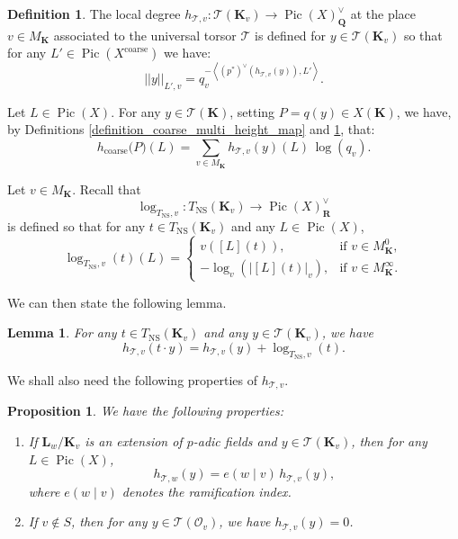 \documentclass{proc-l}
\newcommand{\R}{\mathbf{R}}
\newcommand{\K}{\mathbf{K}}
\newcommand{\Q}{\mathbf{Q}}
\newcommand{\Le}{\mathbf{L}}
\DeclareMathOperator{\Pic}{Pic}
\DeclareMathOperator{\NS}{NS}
\DeclareMathOperator{\coarse}{coarse}
\newcommand{\stackT}{\mathcal{T}}
\newcommand{\sheafO}{\mathcal{O}}
\newtheorem{lemma}[theorem]{Lemma}
\newtheorem{prop}[theorem]{Proposition}
\theoremstyle{definition}
\newtheorem{definition}[theorem]{Definition}
\theoremstyle{remark}
\numberwithin{equation}{section}
\begin{document}
\begin{definition}\label{definition_naive_local_degree}
    The local degree $h_{\stackT,v} :\stackT(\K_v) \rightarrow \Pic(X)^{\vee}_{\Q}$ at the place $v \in M_{\K}$ associated to the universal torsor $\stackT$ is defined for $y \in \stackT(\K_v)$ so that for any $L' \in \Pic(X^{\coarse})$ we have:
    $$||y||_{L',v} = q_v^{- \left\langle (p^*)^{\vee}(h_{\stackT,v}(y)) , L' \right\rangle }  .$$

\end{definition}

Let $L \in \Pic(X)$. For any $y \in \stackT(\K)$, setting
$P = q(y) \in X(\K)$, we have, by Definitions \ref{definition_coarse_multi_height_map} and \ref{definition_naive_local_degree}, that:
\begin{equation}\label{equation_local_height_global_height_coarse_space}
h_{\coarse}\bigl(P\bigr)(L)
=
\sum_{v \in M_{\K}}
h_{\stackT,v}(y)(L)\, \log(q_v).
\end{equation}

Let $v \in M_{\K}$. Recall that
\[
\log_{T_{\NS},v} : T_{\NS}(\K_v) \longrightarrow \Pic(X)^{\vee}_{\R}
\]
is defined so that for any $t \in T_{\NS}(\K_v)$ and any $L \in \Pic(X)$,
\[
\log_{T_{\NS},v}(t)(L)
=
\begin{cases}
v\!\left([L](t)\right), & \text{if } v \in M_{\K}^{0}, \\[0.3em]
- \log_v\!\left(\lvert [L](t) \rvert_v\right), & \text{if } v \in M_{\K}^{\infty}.
\end{cases}
\]

We can then state the following lemma.

\begin{lemma}\label{lemma_hauteur_locale_torseur_univ_et_action_de_tns}
For any $t \in T_{\NS}(\K_v)$ and any $y \in \stackT(\K_v)$, we have
\[
h_{\stackT,v}(t \cdot y)
=
h_{\stackT,v}(y) + \log_{T_{\NS},v}(t).
\]
\end{lemma}

We shall also need the following properties of $h_{\stackT,v}$.

\begin{prop}\label{proposition_properties_local_degree}
We have the following properties:
\begin{enumerate}
\item
If $\Le_w / \K_v$ is an extension of $p$-adic fields and $y \in \stackT(\K_v)$, then for any $L \in \Pic(X)$,
\[
h_{\stackT,w}(y) = e(w \mid v)\, h_{\stackT,v}(y),
\]
where $e(w \mid v)$ denotes the ramification index.

\item
If $v \not\in S$, then for any $y \in \stackT(\sheafO_v)$, we have $h_{\stackT,v}(y) = 0$.
\end{enumerate}
\end{prop}
\end{document}
